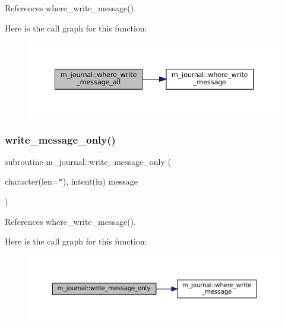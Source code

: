 References where\+\_\+write\+\_\+message().

Here is the call graph for this function\+:\nopagebreak
\begin{figure}[H]
\begin{center}
\leavevmode
\includegraphics[width=350pt]{namespacem__journal_a25d0f5da7f7e84e22ab0a583447412b1_cgraph}
\end{center}
\end{figure}
\mbox{\label{namespacem__journal_aa86511a7c388f9286c282f6fa933ab58}} 
\subsubsection{\texorpdfstring{write\+\_\+message\+\_\+only()}{write\_message\_only()}}
{\footnotesize\ttfamily subroutine m\+\_\+journal\+::write\+\_\+message\+\_\+only (\begin{DoxyParamCaption}\item[{character(len=$\ast$), intent(in)}]{message }\end{DoxyParamCaption})\hspace{0.3cm}{\ttfamily [private]}}



References where\+\_\+write\+\_\+message().

Here is the call graph for this function\+:\nopagebreak
\begin{figure}[H]
\begin{center}
\leavevmode
\includegraphics[width=350pt]{namespacem__journal_aa86511a7c388f9286c282f6fa933ab58_cgraph}
\end{center}
\end{figure}


